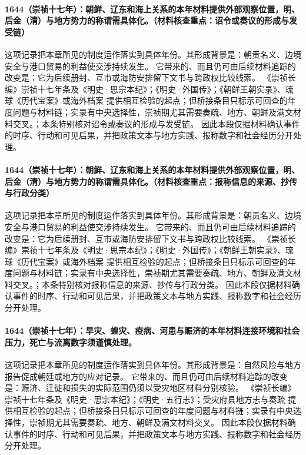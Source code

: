 \paragraph{1644（崇祯十七年）：朝鲜、辽东和海上关系的本年材料提供外部观察位置，明、后金（清）与地方势力的称谓需具体化。（材料核查重点：诏令或奏议的形成与发受链）} 这项记录把本章所见的制度运作落实到具体年份。其形成背景是：朝贡名义、边境安全与港口贸易的利益使交涉持续发生。 它带来的、而且仍可由后续材料追踪的改变是：它为后续册封、互市或海防安排留下文书与跨政权比较线索。 《崇祯长编》崇祯十七年条及《明史·思宗本纪》；《明史·外国传》；《朝鲜王朝实录》、琉球《历代宝案》或海外档案 提供相互检验的起点；但桥接条目只标示可回查的年度问题与材料链；实录有中央选择性，崇祯期尤其需要奏疏、地方、朝鲜及满文材料交叉。；本条特别核对诏令或奏议的形成与发受链。 因此本段仅据材料确认事件的时序、行动和可见后果，并把政策文本与地方实践、报称数字和社会经历分开处理。

\paragraph{1644（崇祯十七年）：朝鲜、辽东和海上关系的本年材料提供外部观察位置，明、后金（清）与地方势力的称谓需具体化。（材料核查重点：报称信息的来源、抄传与行政分类）} 这项记录把本章所见的制度运作落实到具体年份。其形成背景是：朝贡名义、边境安全与港口贸易的利益使交涉持续发生。 它带来的、而且仍可由后续材料追踪的改变是：它为后续册封、互市或海防安排留下文书与跨政权比较线索。 《崇祯长编》崇祯十七年条及《明史·思宗本纪》；《明史·外国传》；《朝鲜王朝实录》、琉球《历代宝案》或海外档案 提供相互检验的起点；但桥接条目只标示可回查的年度问题与材料链；实录有中央选择性，崇祯期尤其需要奏疏、地方、朝鲜及满文材料交叉。；本条特别核对报称信息的来源、抄传与行政分类。 因此本段仅据材料确认事件的时序、行动和可见后果，并把政策文本与地方实践、报称数字和社会经历分开处理。

\paragraph{1644（崇祯十七年）：旱灾、蝗灾、疫病、河患与赈济的本年材料连接环境和社会压力，死亡与流离数字须谨慎处理。} 这项记录把本章所见的制度运作落实到具体年份。其形成背景是：自然风险与地方报告促成朝廷或地方的应对记录。 它带来的、而且仍可由后续材料追踪的改变是：赈济、迁徙和损失的实际范围仍须以受灾地区材料分别核验。 《崇祯长编》崇祯十七年条及《明史·思宗本纪》；《明史·五行志》；受灾府县地方志与奏疏 提供相互检验的起点；但桥接条目只标示可回查的年度问题与材料链；实录有中央选择性，崇祯期尤其需要奏疏、地方、朝鲜及满文材料交叉。 因此本段仅据材料确认事件的时序、行动和可见后果，并把政策文本与地方实践、报称数字和社会经历分开处理。

